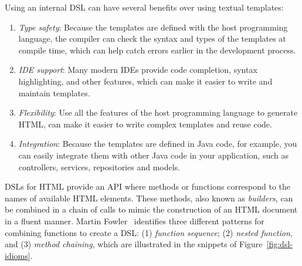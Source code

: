 \documentclass[software,article,accept,pdftex,moreauthors]{Definitions/mdpi}
\begin{document}
Using an internal DSL can have several benefits over using textual templates:
\begin{enumerate}
  \item \emph{Type safety}: Because the templates are defined with the host
        programming language, the compiler can check the syntax and types of the
        templates at compile time, which can help catch errors earlier in the
        development process.

  \item \emph{IDE support}: Many modern IDEs provide code completion, syntax
        highlighting, and other features, which can make it easier to write and
        maintain templates.

  \item \emph{Flexibility}: Use all the features of the host programming language
        to generate HTML, can make it easier to write complex templates and reuse code.

  \item \emph{Integration}: Because the templates are defined in Java code, for
        example, you can easily integrate them with other Java code in your
        application, such as controllers, services, repositories and models.

\end{enumerate}

DSLs for HTML provide an API where methods or functions correspond to the names
of available HTML elements. These methods, also known as \textit{builders}, can
be combined in a chain of calls to mimic the construction of an HTML document
in a fluent manner. Martin Fowler~\cite{Fowler03} identifies three different
patterns for combining functions to create a DSL: (1) \textit{function
  sequence}; (2) \textit{nested function}, and (3) \textit{method chaining}, which
are illustrated in the snippets of Figure~\ref{fig:dsl-idioms}.
\end{document}
